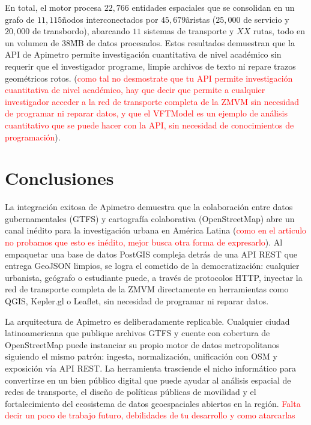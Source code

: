 \documentclass{isprs} %
\begin{document}
En total, el motor procesa $22,766$ entidades espaciales que se consolidan en un grafo de $11,115$\~nodos interconectados por $45,679$\~aristas ($25,000$ de servicio y $20,000$ de transbordo), abarcando $11$ sistemas de transporte y $XX$ rutas, todo en un volumen de $38$\~MB de datos procesados. Estos resultados demuestran que la API de Apimetro permite investigación cuantitativa de nivel académico sin requerir que el investigador programe, limpie archivos de texto ni repare trazos geométricos rotos. (\textcolor{red}{como tal no desmostrate que tu API permite investigación cuantitativa de nivel académico, hay que decir que permite a cualquier investigador acceder a la red de transporte completa de la ZMVM sin necesidad de programar ni reparar datos, y que el VFTModel es un ejemplo de análisis cuantitativo que se puede hacer con la API, sin necesidad de conocimientos de programación}).

\section{Conclusiones}
\label{sec:Conclusiones}

La integración exitosa de Apimetro demuestra que la colaboración entre datos gubernamentales (GTFS) y cartografía colaborativa (OpenStreetMap) abre un canal inédito para la investigación urbana en América Latina (\textcolor{red}{como en el articulo no probamos que esto es inédito, mejor busca otra forma de expresarlo}). Al empaquetar una base de datos PostGIS compleja detrás de una API REST que entrega GeoJSON limpios, se logra el cometido de la democratización: cualquier urbanista, geógrafo o estudiante puede, a través de protocolos HTTP, inyectar la red de transporte completa de la ZMVM directamente en herramientas como QGIS, Kepler.gl o Leaflet, sin necesidad de programar ni reparar datos.

La arquitectura de Apimetro es deliberadamente replicable.  Cualquier ciudad latinoamericana que publique archivos GTFS y cuente con cobertura de OpenStreetMap puede instanciar su propio motor de datos metropolitanos siguiendo el mismo patrón: ingesta, normalización, unificación con OSM y exposición vía API REST.  La herramienta trasciende el nicho informático para convertirse en un bien público digital que puede ayudar al análisis espacial de redes de transporte, el diseño de políticas públicas de movilidad y el fortalecimiento del ecosistema de datos geoespaciales abiertos en la región. \textcolor{red}{Falta decir un poco de trabajo futuro, debilidades de tu desarrollo y como atarcarlas}
\end{document}
